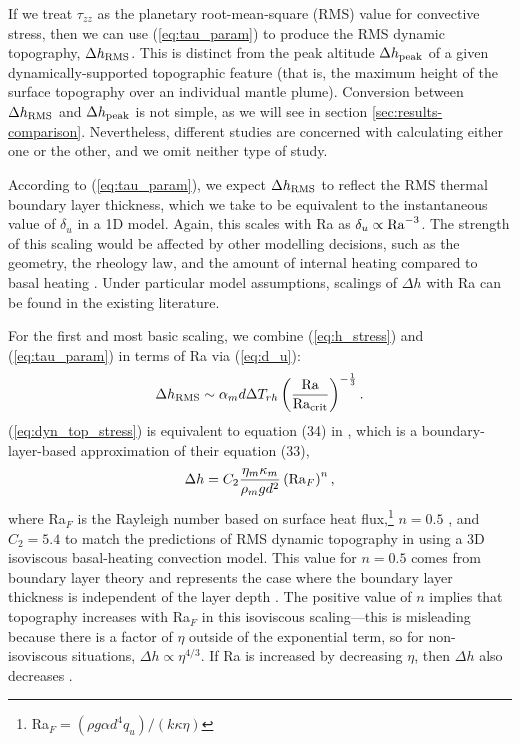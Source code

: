 If we treat $\tau_{zz}$ as the planetary root-mean-square (RMS) value for convective stress, then we can use (\ref{eq:tau_param}) to produce the RMS dynamic topography, $\Delta h_{\rm RMS}$. This is distinct from the peak altitude $\Delta h_{\rm peak}$ of a given dynamically-supported topographic feature (that is, the maximum height of the surface topography over an individual mantle plume). Conversion between $\Delta h_{\rm RMS}$ and $\Delta h_{\rm peak}$ is not simple, as we will see in section \ref{sec:results-comparison}. Nevertheless, different studies are concerned with calculating either one or the other, and we omit neither type of study.

According to (\ref{eq:tau_param}), we expect $\Delta h_{\rm RMS}$ to reflect the RMS thermal boundary layer thickness, which we take to be equivalent to the instantaneous value of $\delta_u$ in a 1D model. Again, this scales with Ra as $\delta_u \propto {\rm Ra}^{-3}$. The strength of this scaling would be affected by other modelling decisions, such as the geometry, the rheology law, and the amount of internal heating compared to basal heating \citep{McKenzie1977}. Under particular model assumptions, scalings of $\Delta h$ with Ra can be found in the existing literature.

For the first and most basic scaling, we combine (\ref{eq:h_stress}) and (\ref{eq:tau_param}) in terms of Ra via (\ref{eq:d_u}):
\begin{equation}\label{eq:dyn_top_stress}
\Delta h_{\rm RMS} \sim \alpha_m d \Delta T_{rh} \left(\frac{\rm Ra}{\rm Ra_{\rm crit}}\right)^{-\frac{1}{3}}.
\end{equation}
(\ref{eq:dyn_top_stress}) is equivalent to equation (34) in \citet{Parsons1983}, which is a boundary-layer-based approximation of their equation (33),
\begin{equation}\label{eq:PD83_0}
\Delta h = C_2 \frac{\eta_m \kappa_m}{\rho_m g d^2} \left({\rm Ra}_F\right)^n,
\end{equation}
where Ra$_F$ is the Rayleigh number based on surface heat flux,\footnote{Ra$_F = (\rho g \alpha d^4 q_u)/(k \kappa \eta)$} $n = 0.5$ \citep{McKenzie1977}, and $C_2 = 5.4$ to match the predictions of RMS dynamic topography in \citet{Lees2019} using a 3D isoviscous basal-heating convection model. This value for $n = 0.5$ comes from boundary layer theory and represents the case where the boundary layer thickness is independent of the layer depth \citep{McKenzie1974}. The positive value of $n$ implies that topography increases with Ra$_F$ in this isoviscous scaling---this is misleading because there is a factor of $\eta$ outside of the exponential term, so for non-isoviscous situations, $ \Delta h \propto \eta^{4/3}$. If Ra is increased by decreasing $\eta$, then $\Delta h$ also decreases \citep{Nimmo1996}.


